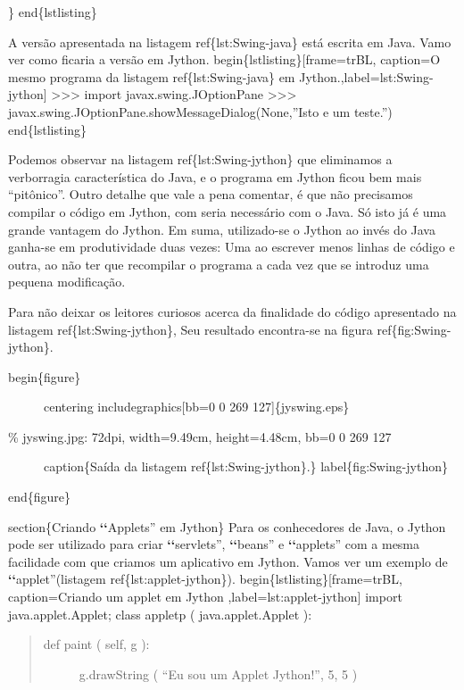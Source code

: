 \documentclass[a4paper,10pt,portuguese]{sphinxmanual}
\begin{document}
\}
end\{lstlisting\}

A versão apresentada na listagem ref\{lst:Swing-java\} está escrita em Java. Vamo ver como ficaria a versão em Jython.
begin\{lstlisting\}{[}frame=trBL, caption=O mesmo programa da listagem ref\{lst:Swing-java\} em Jython.,label=lst:Swing-jython{]}
\textgreater{}\textgreater{}\textgreater{} import javax.swing.JOptionPane
\textgreater{}\textgreater{}\textgreater{} javax.swing.JOptionPane.showMessageDialog(None,''Isto e um teste.'')
end\{lstlisting\}

Podemos observar na listagem ref\{lst:Swing-jython\} que eliminamos a verborragia característica do Java, e o programa em Jython ficou bem mais ``pitônico''. Outro detalhe que vale a pena comentar, é que não precisamos compilar o código em Jython, com seria necessário com o Java. Só isto já é uma grande vantagem do Jython. Em suma, utilizado-se o Jython ao invés do Java ganha-se em produtividade duas vezes: Uma ao escrever menos linhas de código e outra, ao não ter que recompilar o programa a cada vez que se introduz uma pequena modificação.

Para não deixar os leitores curiosos acerca da finalidade do código apresentado na listagem ref\{lst:Swing-jython\}, Seu resultado encontra-se na figura ref\{fig:Swing-jython\}.
\begin{description}
\item[{begin\{figure\}}] \leavevmode
centering
includegraphics{[}bb=0 0 269 127{]}\{jyswing.eps\}

\item[{\% jyswing.jpg: 72dpi, width=9.49cm, height=4.48cm, bb=0 0 269 127}] \leavevmode
caption\{Saída da listagem ref\{lst:Swing-jython\}.\}
label\{fig:Swing-jython\}

\end{description}

end\{figure\}

section\{Criando {\color{red}\bfseries{}{}`{}`}Applets'' em Jython\}
Para os conhecedores de Java, o Jython pode ser utilizado para criar {\color{red}\bfseries{}{}`{}`}servlets'', {\color{red}\bfseries{}{}`{}`}beans'' e {\color{red}\bfseries{}{}`{}`}applets'' com a mesma facilidade com que criamos um aplicativo em Jython. Vamos ver um exemplo de {\color{red}\bfseries{}{}`{}`}applet''(listagem ref\{lst:applet-jython\}).
begin\{lstlisting\}{[}frame=trBL, caption=Criando um applet em Jython ,label=lst:applet-jython{]}
import java.applet.Applet;
class appletp ( java.applet.Applet ):
\begin{quote}
\begin{description}
\item[{def paint ( self, g ):}] \leavevmode
g.drawString ( ``Eu sou um Applet Jython!'', 5, 5 )

\end{description}
\end{quote}
\end{document}
